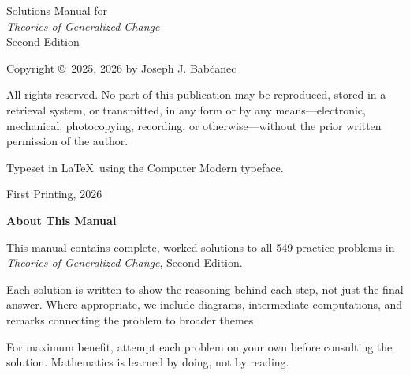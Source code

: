 \documentclass[12pt, oneside]{book}
\begin{document}
\noindent Solutions Manual for\\
\textit{Theories of Generalized Change}\\
Second Edition

\vspace{1.2cm}

\noindent Copyright \copyright\ 2025, 2026 by Joseph J. Bab\v{c}anec

\vspace{0.8cm}

\noindent All rights reserved. No part of this publication may be reproduced, stored in a retrieval system, or transmitted, in any form or by any means---electronic, mechanical, photocopying, recording, or otherwise---without the prior written permission of the author.

\vspace{1.2cm}

\noindent Typeset in \LaTeX\ using the Computer Modern typeface.

\vfill

\noindent First Printing, 2026

\clearpage

\hypersetup{pageanchor=true}
\tableofcontents

\newpage
\thispagestyle{empty}
\vspace*{3cm}

\begin{center}
{\Large \textbf{About This Manual}}
\end{center}

\bigskip

\noindent This manual contains complete, worked solutions to all 549 practice problems in \textit{Theories of Generalized Change}, Second Edition.

\medskip

\noindent Each solution is written to show the reasoning behind each step, not just the final answer. Where appropriate, we include diagrams, intermediate computations, and remarks connecting the problem to broader themes.

\medskip

\noindent For maximum benefit, attempt each problem on your own before consulting the solution. Mathematics is learned by doing, not by reading.

\cleardoublepage
{}








\end{document}
